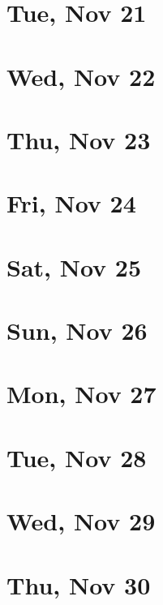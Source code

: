 	\section{Tue, Nov 21}
		
	\section{Wed, Nov 22}
		
	\section{Thu, Nov 23}
		
	\section{Fri, Nov 24}
		
	\section{Sat, Nov 25}
		
	\section{Sun, Nov 26}
		
	\section{Mon, Nov 27}
		
	\section{Tue, Nov 28}
		
	\section{Wed, Nov 29}
		
	\section{Thu, Nov 30}
		
